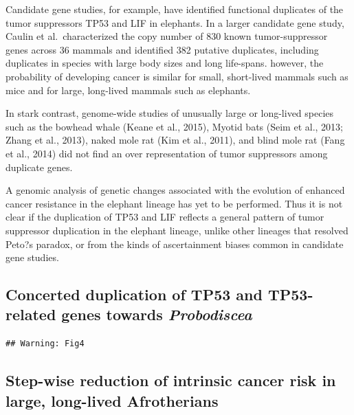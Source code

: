 \documentclass[10pt,letterpaper]{article}
\begin{document}
Candidate gene studies, for example, have identified functional
duplicates of the tumor suppressors TP53 and LIF in elephants. In a
larger candidate gene study, Caulin et al.~characterized the copy number
of 830 known tumor-suppressor genes across 36 mammals and identified 382
putative duplicates, including duplicates in species with large body
sizes and long life-spans. however, the probability of developing cancer
is similar for small, short-lived mammals such as mice and for large,
long-lived mammals such as elephants.

In stark contrast, genome-wide studies of unusually large or long-lived
species such as the bowhead whale (Keane et al., 2015), Myotid bats
(Seim et al., 2013; Zhang et al., 2013), naked mole rat (Kim et al.,
2011), and blind mole rat (Fang et al., 2014) did not find an over
representation of tumor suppressors among duplicate genes.

A genomic analysis of genetic changes associated with the evolution of
enhanced cancer resistance in the elephant lineage has yet to be
performed. Thus it is not clear if the duplication of TP53 and LIF
reflects a general pattern of tumor suppressor duplication in the
elephant lineage, unlike other lineages that resolved Peto?s paradox, or
from the kinds of ascertainment biases common in candidate gene studies.

\hypertarget{concerted-duplication-of-tp53-and-tp53-related-genes-towards-probodiscea}{%
\subsection{\texorpdfstring{Concerted duplication of TP53 and
TP53-related genes towards
\emph{Probodiscea}}{Concerted duplication of TP53 and TP53-related genes towards Probodiscea}}\label{concerted-duplication-of-tp53-and-tp53-related-genes-towards-probodiscea}}

\begin{verbatim}
## Warning: Fig4
\end{verbatim}

\hypertarget{step-wise-reduction-of-intrinsic-cancer-risk-in-large-long-lived-afrotherians}{%
\subsection{Step-wise reduction of intrinsic cancer risk in large,
long-lived
Afrotherians}\label{step-wise-reduction-of-intrinsic-cancer-risk-in-large-long-lived-afrotherians}}
\end{document}
